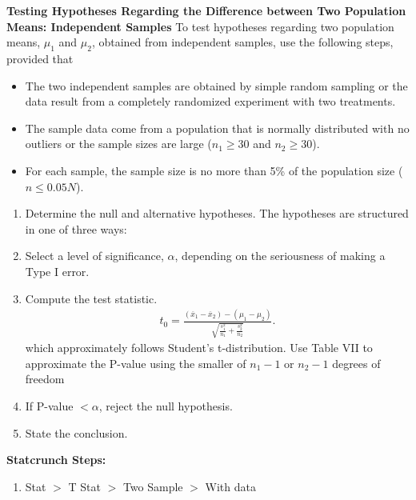 \documentclass{report}
\begin{document}
    \bigbreak \noindent 
    \textbf{Testing Hypotheses Regarding the Difference between Two Population Means: Independent Samples}
    \bigbreak \noindent 
    To test hypotheses regarding two population means, $\mu_1$ and $\mu_2$, obtained from independent samples, use the following steps, provided that
    \begin{itemize}
        \item The two independent samples are obtained by simple random sampling or the data result from a completely randomized experiment with two treatments.
        \item The sample data come from a population that is normally distributed with no outliers or the sample sizes are large ($n_1 \geq 30$ and $n_2 \geq 30$).
        \item For each sample, the sample size is no more than 5\% of the population size ($n \leq 0.05N$).
    \end{itemize}
    \bigbreak \noindent 
    \begin{enumerate}
        \item Determine the null and alternative hypotheses. The hypotheses are structured in one of three ways:
        \item Select a level of significance, $\alpha $, depending on the seriousness of making a Type I error.
        \item Compute the test statistic.
            \begin{align*}
                t_{0} = \frac{(\overline{x}_{1} - \overline{x}_{2}) - (\mu_{1} - \mu_{2})}{\sqrt{\frac{s_{1}^{2}}{n_{1}} + \frac{s_{2}^{2}}{n_{2}}}}
            .\end{align*}
            which approximately follows Student's t-distribution. Use Table VII to approximate the P-value using the smaller of $n_{1} -1 $ or $n_{2} -1 $ degrees of freedom
        \item If P-value $< \alpha $, reject the null hypothesis.
        \item State the conclusion.
    \end{enumerate}

    \pagebreak \bigbreak \noindent 
    \textbf{Statcrunch Steps:}
    \bigbreak \noindent 
    \begin{enumerate}
        \item Stat $> $ T Stat $> $ Two Sample $> $ With data
    \end{enumerate}

    \pagebreak 
\end{document}
